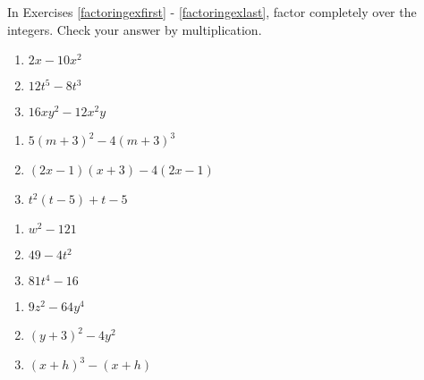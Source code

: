 \documentclass{ximera}
\begin{document}
	\author{Stitz-Zeager}



\label{ExercisesforAppFactoring}

In Exercises \ref{factoringexfirst} - \ref{factoringexlast}, factor completely over the integers.  Check your answer by multiplication.

\begin{multicols}{3}
\begin{enumerate}

\item $2x - 10x^2$ \label{factoringexfirst}
\item $12t^5 - 8t^3$
\item $16xy^2 - 12x^2y$

\setcounter{HW}{\value{enumi}}
\end{enumerate}
\end{multicols}

\begin{multicols}{3}
\begin{enumerate}
\setcounter{enumi}{\value{HW}}

\item $5(m+3)^2- 4(m+3)^3$
\item $(2x-1)(x+3) - 4(2x-1)$
\item $t^2(t-5) + t - 5$

\setcounter{HW}{\value{enumi}}
\end{enumerate}
\end{multicols}

\begin{multicols}{3}
\begin{enumerate}
\setcounter{enumi}{\value{HW}}

\item $w^2 - 121$
\item $49 - 4t^2$
\item $81t^4 - 16$

\setcounter{HW}{\value{enumi}}
\end{enumerate}
\end{multicols}

\begin{multicols}{3}
\begin{enumerate}
\setcounter{enumi}{\value{HW}}

\item $9z^2 - 64y^4$
\item $(y+3)^2 - 4y^2$
\item $(x+h)^3 - (x+h)$

\setcounter{HW}{\value{enumi}}
\end{enumerate}
\end{multicols}
\end{document}
